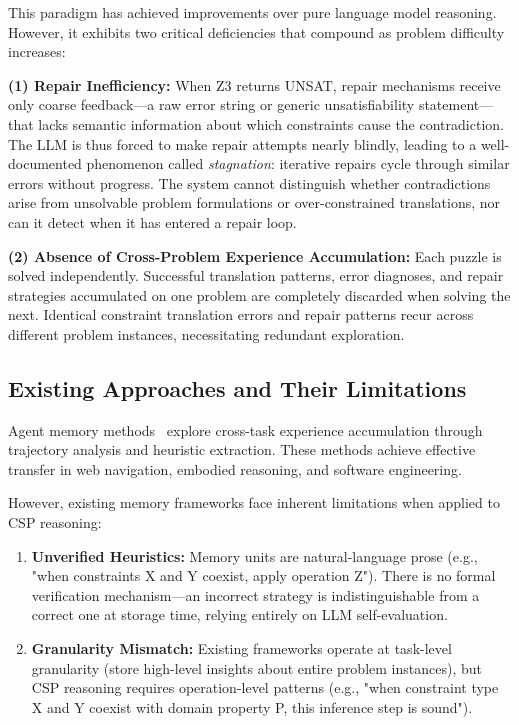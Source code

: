 This paradigm has achieved improvements over pure language model reasoning. However, it exhibits two critical deficiencies that compound as problem difficulty increases:

\textbf{(1) Repair Inefficiency:} When Z3 returns UNSAT, repair mechanisms receive only coarse feedback—a raw error string or generic unsatisfiability statement—that lacks semantic information about which constraints cause the contradiction. The LLM is thus forced to make repair attempts nearly blindly, leading to a well-documented phenomenon called \textit{stagnation}: iterative repairs cycle through similar errors without progress. The system cannot distinguish whether contradictions arise from unsolvable problem formulations or over-constrained translations, nor can it detect when it has entered a repair loop.

\textbf{(2) Absence of Cross-Problem Experience Accumulation:} Each puzzle is solved independently. Successful translation patterns, error diagnoses, and repair strategies accumulated on one problem are completely discarded when solving the next. Identical constraint translation errors and repair patterns recur across different problem instances, necessitating redundant exploration.

\subsection{Existing Approaches and Their Limitations}

Agent memory methods~\citep{shinn2023language, zhao2024expel, ouyang2025language} explore cross-task experience accumulation through trajectory analysis and heuristic extraction. These methods achieve effective transfer in web navigation, embodied reasoning, and software engineering.

However, existing memory frameworks face inherent limitations when applied to CSP reasoning:
\begin{enumerate}
    \item \textbf{Unverified Heuristics:} Memory units are natural-language prose (e.g., "when constraints X and Y coexist, apply operation Z"). There is no formal verification mechanism—an incorrect strategy is indistinguishable from a correct one at storage time, relying entirely on LLM self-evaluation.
    \item \textbf{Granularity Mismatch:} Existing frameworks operate at task-level granularity (store high-level insights about entire problem instances), but CSP reasoning requires operation-level patterns (e.g., "when constraint type X and Y coexist with domain property P, this inference step is sound").
\end{enumerate}

